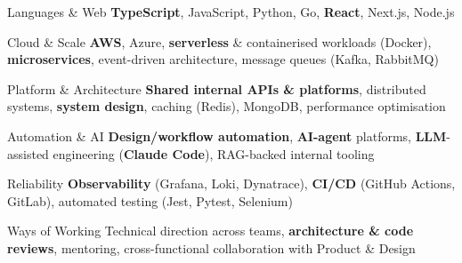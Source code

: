 
\begin{cvskills}

  \cvskill
  {Languages \& Web}
  {\textbf{TypeScript}, JavaScript, Python, Go, \textbf{React}, Next.js, Node.js}

  \cvskill
  {Cloud \& Scale}
  {\textbf{AWS}, Azure, \textbf{serverless} \& containerised workloads (Docker), \textbf{microservices}, event-driven architecture, message queues (Kafka, RabbitMQ)}

  \cvskill
  {Platform \& Architecture}
  {\textbf{Shared internal APIs \& platforms}, distributed systems, \textbf{system design}, caching (Redis), MongoDB, performance optimisation}

  \cvskill
  {Automation \& AI}
  {\textbf{Design/workflow automation}, \textbf{AI-agent} platforms, \textbf{LLM}-assisted engineering (\textbf{Claude Code}), RAG-backed internal tooling}

  \cvskill
  {Reliability}
  {\textbf{Observability} (Grafana, Loki, Dynatrace), \textbf{CI/CD} (GitHub Actions, GitLab), automated testing (Jest, Pytest, Selenium)}

  \cvskill
  {Ways of Working}
  {Technical direction across teams, \textbf{architecture \& code reviews}, mentoring, cross-functional collaboration with Product \& Design}

\end{cvskills}

